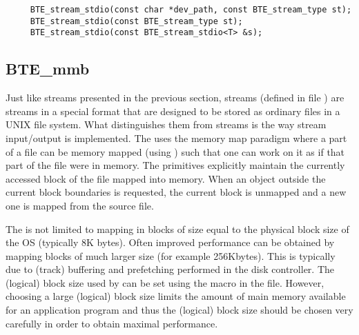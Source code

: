 \begin{verbatim}
     BTE_stream_stdio(const char *dev_path, const BTE_stream_type st); 
     BTE_stream_stdio(const BTE_stream_type st); 
     BTE_stream_stdio(const BTE_stream_stdio<T> &s);
\end{verbatim}

\subsection{BTE\_mmb}

\tobeextended

Just like  streams presented in the previous section,
 streams (defined in file ) are
streams in a special format that are designed to be stored as ordinary
files in a UNIX file system. What distinguishes them from 
streams is the way stream input/output is implemented. The 
uses the memory map paradigm where a part of a file can be memory mapped
(using ) such that one can work on it as if that part of the
file were in memory. The  primitives explicitly maintain the
currently accessed block of the file mapped into memory. When an object
outside the current block boundaries is requested, the current block is
unmapped and a new one is mapped from the source file.

The  is not limited to mapping in blocks of size equal to the
physical block size of the OS (typically 8K bytes). Often improved
performance can be obtained by mapping blocks of much larger size (for
example 256Kbytes). This is typically due to (track) buffering and
prefetching performed in the disk controller. The (logical) block size used
by  can be set using the macro
 in the 
file. However, choosing a large (logical) block size limits the amount of
main memory available for an application program and thus the (logical)
block size should be chosen very carefully in order to obtain maximal
performance.

